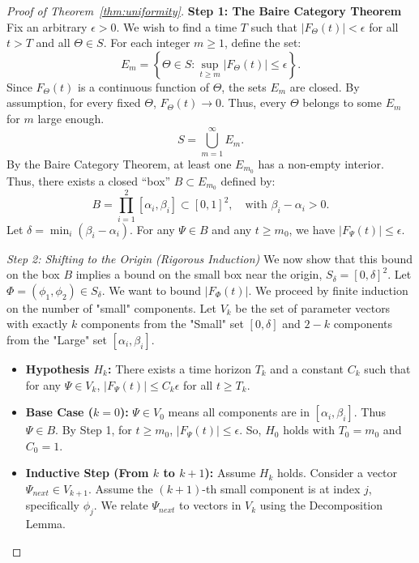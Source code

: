 \documentclass[10pt,reqno]{amsart}
\theoremstyle{definition}
\begin{document}
\begin{proof}[Proof of Theorem~\ref{thm:uniformity}]		
	
	\textbf{Step 1: The Baire Category Theorem}
	Fix an arbitrary $\epsilon > 0$. We wish to find a time $T$ such that $|F_\Theta(t)| < \epsilon$ for all $t > T$ and all $\Theta \in S$.
	For each integer $m \ge 1$, define the set:
	\[ E_m = \left\{ \Theta \in S : \sup_{t \ge m} |F_\Theta(t)| \le \epsilon \right\}. \]
	Since $F_\Theta(t)$ is a continuous function of $\Theta$, the sets $E_m$ are closed.
	By assumption, for every fixed $\Theta$, $F_\Theta(t) \to 0$. Thus, every $\Theta$ belongs to some $E_m$ for $m$ large enough.
	\[ S = \bigcup_{m=1}^\infty E_m. \]
	By the Baire Category Theorem, at least one $E_{m_0}$ has a non-empty interior. Thus, there exists a closed ``box'' $B \subset E_{m_0}$ defined by:
	\[ B = \prod_{i=1}^2 [\alpha_i, \beta_i] \subset [0,1]^2, \quad \text{with } \beta_i - \alpha_i > 0. \]
	Let $\delta = \min_i (\beta_i - \alpha_i)$.
	For any $\Psi \in B$ and any $t \ge m_0$, we have $|F_\Psi(t)| \le \epsilon$.
	
	\textit{Step 2: Shifting to the Origin (Rigorous Induction)}
	We now show that this bound on the box $B$ implies a bound on the small box near the origin, $S_\delta = [0, \delta]^2$.
	Let $\Phi = (\phi_1,\phi_2) \in S_\delta$. We want to bound $|F_\Phi(t)|$.
	We proceed by finite induction on the number of "small" components. Let $V_k$ be the set of parameter vectors with exactly $k$ components from the "Small" set $[0, \delta]$ and $2-k$ components from the "Large" set $[\alpha_i, \beta_i]$.
	
	\begin{itemize}
		\item \textbf{Hypothesis $H_k$:} There exists a time horizon $T_k$ and a constant $C_k$ such that for any $\Psi \in V_k$, $|F_\Psi(t)| \le C_k \epsilon$ for all $t \ge T_k$.
		
		\item \textbf{Base Case ($k=0$):}
		$\Psi \in V_0$ means all components are in $[\alpha_i, \beta_i]$. Thus $\Psi \in B$.
		By Step 1, for $t \ge m_0$, $|F_\Psi(t)| \le \epsilon$.
		So, $H_0$ holds with $T_0 = m_0$ and $C_0 = 1$.
		
		\item \textbf{Inductive Step (From $k$ to $k+1$):}
		Assume $H_k$ holds. Consider a vector $\Psi_{next} \in V_{k+1}$.
		Assume the $(k+1)$-th small component is at index $j$, specifically $\phi_j$.
		We relate $\Psi_{next}$ to vectors in $V_k$ using the Decomposition Lemma.
		

\end{itemize}
\end{proof}
\end{document}
